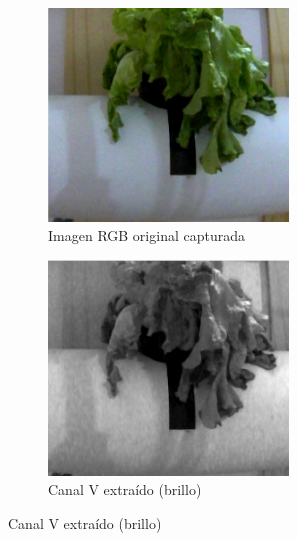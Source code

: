 \begin{figure}[H]
\centering
\begin{subfigure}[b]{0.48\textwidth}
    \centering
    \includegraphics[width=0.7\textwidth]{imagenes/detector_marcadores_1_original.png}
    \caption{Imagen RGB original capturada}
\end{subfigure}
\hfill
\begin{subfigure}[b]{0.48\textwidth}
    \centering
    \includegraphics[width=0.7\textwidth]{imagenes/detector_marcadores_2_canal_v.png}
    \caption{Canal V extraído (brillo)}
\end{subfigure}

\vspace{0.3cm}


\end{figure}
